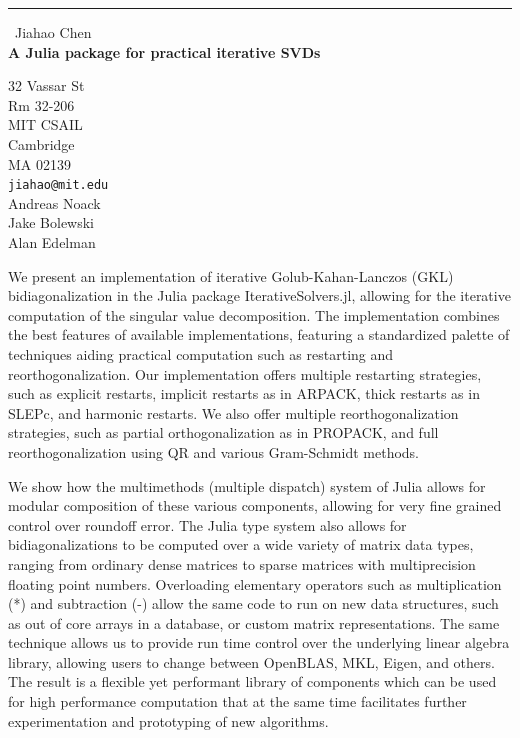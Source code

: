 \documentclass{report}
\begin{document}
\begin{center}
\rule{6in}{1pt} \
{\large Jiahao Chen \\
{\bf A Julia package for practical iterative SVDs}}

32 Vassar St \\ Rm 32-206 \\ MIT CSAIL \\ Cambridge \\ MA 02139
\\
{\tt jiahao@mit.edu}\\
Andreas Noack\\
Jake Bolewski\\
Alan Edelman\end{center}

We present an implementation of iterative Golub-Kahan-Lanczos (GKL)
bidiagonalization in the Julia package IterativeSolvers.jl, allowing for the
iterative computation of the singular value decomposition. The implementation
combines the best features of available implementations, featuring a standardized
palette of techniques aiding practical computation such as restarting and
reorthogonalization. Our implementation offers multiple restarting strategies,
such as explicit restarts, implicit restarts as in ARPACK, thick restarts as
in SLEPc, and harmonic restarts. We also offer multiple
reorthogonalization strategies, such as partial
orthogonalization as in PROPACK, and full reorthogonalization using QR and
various Gram-Schmidt methods.

We show how the multimethods (multiple dispatch) system of Julia allows
for modular composition of these
various components, allowing for very fine grained control over roundoff error.
The Julia type system also allows for bidiagonalizations to be computed over a
wide variety of matrix data types, ranging from ordinary dense matrices to
sparse matrices with multiprecision floating point numbers. Overloading elementary
operators such as multiplication (*) and subtraction (-) allow the same code to
run on new data structures, such as out of core arrays in a database, or custom
matrix representations. The same technique allows us to provide run time control
over the underlying linear algebra library, allowing users to change between
OpenBLAS, MKL, Eigen, and others. The result is a flexible yet performant
library of components which can be used for high performance computation that
at the same time facilitates further experimentation and prototyping of new
algorithms.
\end{document}
